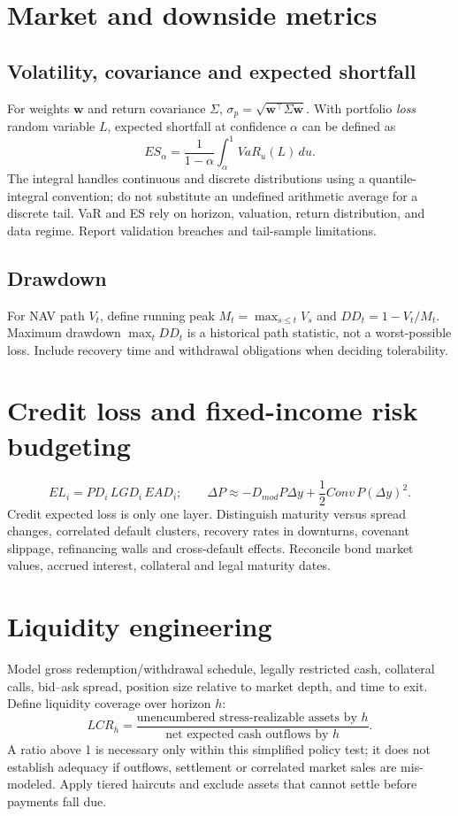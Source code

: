 \documentclass[11pt,letterpaper]{article}
\begin{document}
\section{Market and downside metrics}
\subsection{Volatility, covariance and expected shortfall}
For weights $\mathbf{w}$ and return covariance $\Sigma$, $\sigma_p=\sqrt{\mathbf{w}^\top\Sigma\mathbf{w}}$. With portfolio \emph{loss} random variable $L$, expected shortfall at confidence $\alpha$ can be defined as
\[
ES_\alpha=\frac{1}{1-\alpha}\int_\alpha^1 VaR_u(L)\,du.
\]
The integral handles continuous and discrete distributions using a quantile-integral convention; do not substitute an undefined arithmetic average for a discrete tail. VaR and ES rely on horizon, valuation, return distribution, and data regime. Report validation breaches and tail-sample limitations.

\subsection{Drawdown}
For NAV path $V_t$, define running peak $M_t=\max_{s\leq t}V_s$ and $DD_t=1-V_t/M_t$. Maximum drawdown $\max_t DD_t$ is a historical path statistic, not a worst-possible loss. Include recovery time and withdrawal obligations when deciding tolerability.

\section{Credit loss and fixed-income risk budgeting}
\[
EL_i=PD_i\,LGD_i\,EAD_i;\qquad
\Delta P\approx-D_{mod}P\Delta y+\frac12 Conv\,P(\Delta y)^2.
\]
Credit expected loss is only one layer. Distinguish maturity versus spread changes, correlated default clusters, recovery rates in downturns, covenant slippage, refinancing walls and cross-default effects. Reconcile bond market values, accrued interest, collateral and legal maturity dates.

\section{Liquidity engineering}
Model gross redemption/withdrawal schedule, legally restricted cash, collateral calls, bid--ask spread, position size relative to market depth, and time to exit. Define liquidity coverage over horizon $h$:
\[
LCR_h=\frac{\text{unencumbered stress-realizable assets by }h}{\text{net expected cash outflows by }h}.
\]
A ratio above 1 is necessary only within this simplified policy test; it does not establish adequacy if outflows, settlement or correlated market sales are mis-modeled. Apply tiered haircuts and exclude assets that cannot settle before payments fall due.
\end{document}
